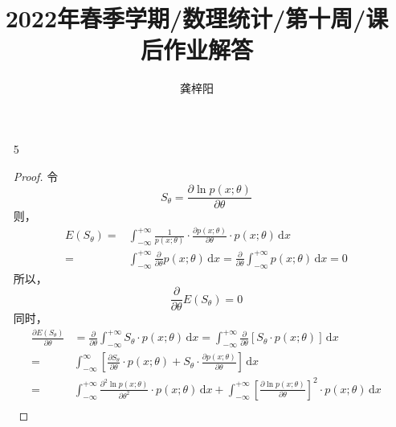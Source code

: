 \documentclass[normal,cn]{elegantnote}
\title{2022年春季学期/数理统计/第十周/课后作业解答}
\author{龚梓阳}
\date{\zhtoday}
\begin{document}
\maketitle
\begin{enumerate}
    \item[5]
        \begin{proof}
            令
            \begin{equation*}
                S_{\theta}=\frac{\partial\ln p\left(x;\theta\right)}{\partial\theta}
            \end{equation*}
            则，
            \begin{equation*}
                \begin{aligned}
                    E\left(S_{\theta}\right)= & \int_{-\infty}^{+\infty}\frac{1}{p\left(x;\theta\right)}\cdot\frac{\partial p\left(x;\theta\right)}{\partial\theta}\cdot p\left(x;\theta\right)\,\mathrm{d}x                            \\
                    =                         & \int_{-\infty}^{+\infty}\frac{\partial}{\partial\theta}p\left(x;\theta\right)\,\mathrm{d}x=\frac{\partial}{\partial\theta}\int_{-\infty}^{+\infty}p\left(x;\theta\right)\,\mathrm{d}x=0
                \end{aligned}
            \end{equation*}
            所以，
            \begin{equation*}
                \frac{\partial}{\partial\theta}E\left(S_{\theta}\right)=0
            \end{equation*}
            同时，
            \begin{equation*}
                \begin{aligned}
                    \frac{\partial E\left(S_{\theta}\right)}{\partial\theta} & =\frac{\partial}{\partial\theta} \int_{-\infty}^{+\infty}S_{\theta}\cdot p\left(x;\theta\right)\,\mathrm{d}x=\int_{-\infty}^{+\infty}\frac{\partial}{\partial\theta}\left[S_{\theta}\cdot p\left(x;\theta\right)\right]\,\mathrm{d}x                                           \\
                    =                                                        & \int_{-\infty}^{\infty}\left[\frac{\partial S_{\theta}}{\partial\theta}\cdot p\left(x;\theta\right)+S_{\theta}\cdot\frac{\partial p\left(x;\theta\right)}{\partial\theta}\right]\,\mathrm{d}x                                                                                  \\
                    =                                                        & \int_{-\infty}^{+\infty}\frac{\partial^{2}\ln p\left(x;\theta\right)}{\partial\theta^{2}}\cdot p\left(x;\theta\right)\,\mathrm{d}x+\int_{-\infty}^{+\infty}\left[\frac{\partial\ln p\left(x;\theta\right)}{\partial\theta}\right]^{2}\cdot p\left(x;\theta\right)\,\mathrm{d}x \\

\end{aligned}
\end{equation*}
\end{proof}
\end{enumerate}
\end{document}
